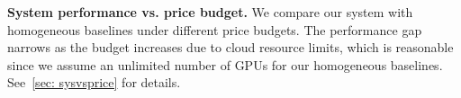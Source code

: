 \textbf{System performance vs. price budget.} We compare our system with homogeneous baselines under different price budgets. The performance gap narrows as the budget increases due to cloud resource limits, which is reasonable since we assume an unlimited number of GPUs for our homogeneous baselines. See~\autoref{sec: sysvsprice} for details.






